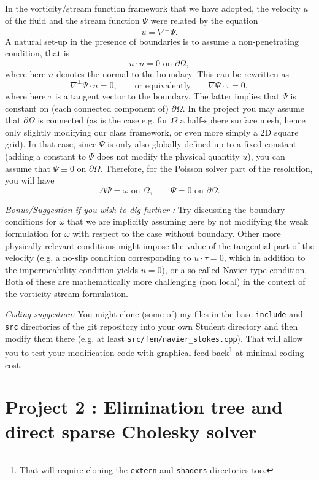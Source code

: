 \documentclass[11pt]{article}
\begin{document}
In the vorticity/stream function framework that we have adopted,
the velocity $u$ of the fluid and the stream function $\Psi$ were related
by the equation  
$$
u = \nabla^\perp \Psi.
$$
A natural set-up in the presence of boundaries is to assume a 
non-penetrating condition, that is
$$
u \cdot n = 0 \text{ on } \partial \Omega,
$$
where here $n$ denotes the normal to the boundary. This can be rewritten as
$$
\nabla^\perp\Psi \cdot n = 0, \qquad \text{or equivalently} \qquad   \nabla \Psi
\cdot \tau = 0,
$$
where here $\tau$ is a tangent vector to the boundary. The latter implies that 
$\Psi$ is constant on (each connected component of) $\partial \Omega.$ In the project
you may assume that $\partial \Omega$ is connected (as is the case e.g. for
$\Omega$ a half-sphere surface mesh, hence only slightly modifying our class 
framework, or even more simply a 2D square grid). In that case, since $\Psi$ is 
only also globally defined up to a fixed constant (adding a constant to $\Psi$
does not modify the physical quantity $u$), you can assume that 
$\Psi \equiv 0$ on $\partial \Omega.$ Therefore, for the Poisson solver part of
the resolution, you will have
$$
\Delta \Psi = \omega \text{ on } \Omega,\qquad \Psi = 0 \text{ on } \partial
\Omega. 
$$

{\it Bonus/Suggestion if you wish to dig further :} Try discussing the 
boundary conditions for $\omega$ that we are implicitly assuming here 
by not modifying the weak formulation for $\omega$ with respect to the
case without boundary. Other more physically relevant conditions might 
impose the value of the tangential part of the velocity (e.g. a 
no-slip condition corresponding to $u \cdot \tau = 0$, which in addition to
the impermeability condition yields $u = 0$), or a so-called Navier type 
condition. Both of these are mathematically more challenging (non local) in 
the context of the vorticity-stream formulation.

{\it Coding suggestion:} You might clone (some of) my files in the base {\tt include}
and {\tt src} directories of the git repository into your own Student directory 
and then modify them there (e.g. at least {\tt src/fem/navier\_stokes.cpp}). 
That will allow you to test your modification code with graphical
feed-back\footnote{That will require cloning the {\tt extern} and {\tt shaders}
directories too.} at minimal coding cost.

\pagebreak
\section*{Project 2 : Elimination tree and direct sparse Cholesky solver}
\end{document}
